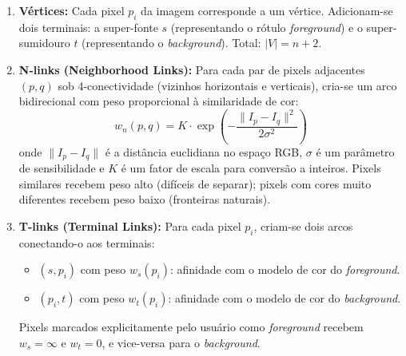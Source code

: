 \documentclass[12pt,a4paper]{article}
\begin{document}
\begin{enumerate}
    \item \textbf{Vértices:} Cada pixel $p_i$ da imagem corresponde a um vértice. Adicionam-se dois terminais: a super-fonte $s$ (representando o rótulo \textit{foreground}) e o super-sumidouro $t$ (representando o \textit{background}). Total: $|V| = n + 2$.

    \item \textbf{N-links (Neighborhood Links):} Para cada par de pixels adjacentes $(p, q)$ sob 4-conectividade (vizinhos horizontais e verticais), cria-se um arco bidirecional com peso proporcional à similaridade de cor:
    \begin{equation}
        w_{n}(p, q) = K \cdot \exp\left(-\frac{\|I_p - I_q\|^2}{2\sigma^2}\right)
    \end{equation}
    onde $\|I_p - I_q\|$ é a distância euclidiana no espaço RGB, $\sigma$ é um parâmetro de sensibilidade e $K$ é um fator de escala para conversão a inteiros. Pixels similares recebem peso alto (difíceis de separar); pixels com cores muito diferentes recebem peso baixo (fronteiras naturais).

    \item \textbf{T-links (Terminal Links):} Para cada pixel $p_i$, criam-se dois arcos conectando-o aos terminais:
    \begin{itemize}
        \item $(s, p_i)$ com peso $w_s(p_i)$: afinidade com o modelo de cor do \textit{foreground}.
        \item $(p_i, t)$ com peso $w_t(p_i)$: afinidade com o modelo de cor do \textit{background}.
    \end{itemize}
    Pixels marcados explicitamente pelo usuário como \textit{foreground} recebem $w_s = \infty$ e $w_t = 0$, e vice-versa para o \textit{background}.
\end{enumerate}
\end{document}
